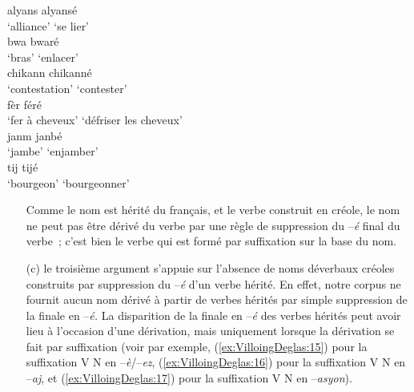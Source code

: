 \documentclass[output=paper]{langsci/langscibook}
\begin{document}
\ea\label{ex:VilloingDeglas:14}
\ea \gll alyans \textrightarrow{~} alyansé \\
  `alliance' {} {`se lier'}\\
\ex \gll bwa \textrightarrow{~} bwaré \\
  `bras' {} {`enlacer'}\\
\ex \gll chikann \textrightarrow{~} chikanné \\
  `contestation' {} {`contester'}\\
\ex \gll fèr \textrightarrow{~} féré \\
  {`fer à cheveux'} {} {`défriser les cheveux'}\\
\ex \gll janm \textrightarrow{~} janbé \\
  `jambe' {} {`enjamber'}\\
\ex \gll tij \textrightarrow{~} tijé \\
  `bourgeon' {} {`bourgeonner'}\\
\z\z

\begin{enumerate}
\item[] Comme le nom est hérité du français, et le verbe construit en créole, le
nom ne peut pas être dérivé du verbe par une règle de suppression du
--\emph{é} final du verbe~; c'est bien le verbe qui est formé par
suffixation sur la base du nom.

\item[(c)] le troisième argument s'appuie sur l'absence de noms déverbaux
créoles construits par suppression du --\emph{é} d'un verbe hérité. En
effet, notre corpus ne fournit aucun nom dérivé à partir de verbes
hérités par simple suppression de la finale en --\emph{é.} La
disparition de la finale en --\emph{é} des verbes hérités peut avoir
lieu à l'occasion d'une dérivation, mais uniquement lorsque la
dérivation se fait par suffixation (voir par exemple, (\ref{ex:VilloingDeglas:15}) pour la
suffixation V\textrightarrow{~} N en --\emph{è}/--\emph{ez}, (\ref{ex:VilloingDeglas:16}) pour la suffixation V\textrightarrow{~} N
en --\emph{aj}, et (\ref{ex:VilloingDeglas:17}) pour la suffixation V\textrightarrow{~} N en --\emph{asyon}).
\end{enumerate}
\end{document}
